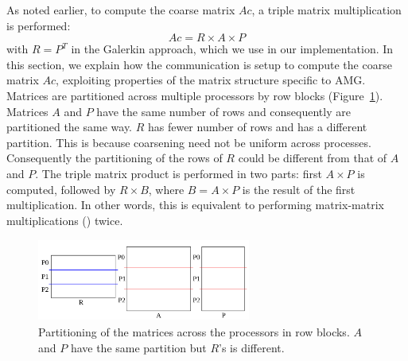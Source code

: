 
As noted earlier, to compute the coarse matrix $Ac$, a triple matrix multiplication is performed:
\begin{equation}
 Ac = R \times A \times P
\end{equation}
with $R = P^T$ in the Galerkin approach, which we use in our implementation.
%
In this section, we explain how the communication is setup to compute the coarse matrix $Ac$, exploiting properties of the matrix structure specific to AMG. 
%
Matrices are partitioned across multiple processors by row blocks (Figure~\ref{fig:partition}). Matrices $A$ and $P$ have the same number of rows and consequently are partitioned the same way. $R$ has fewer number of rows and has a different partition. This is because coarsening need not be uniform across processes. Consequently the partitioning of the rows of $R$ could be different from that of $A$ and $P$. The triple matrix product is performed in two parts: first $A \times P$ is computed, followed by $R \times B$, where $B = A \times P$ is the result of the first multiplication. In other words, this is equivalent to performing matrix-matrix multiplications (\mm) twice.

\begin{figure}[tbh]
 \centering
 \includegraphics[width=7cm,height=2.7cm]{./figures/partition.pdf}
 \caption{Partitioning of the matrices across the processors in row blocks. $A$ and $P$ have the same partition but $R$'s is different.}
 \label{fig:partition}
 \Description{}
\end{figure}

